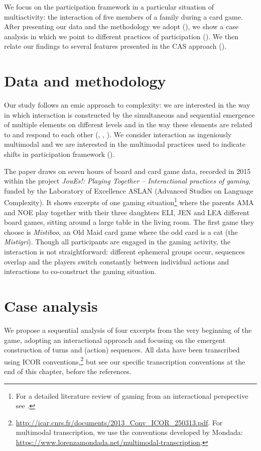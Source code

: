 \documentclass[output=paper]{langscibook}
\begin{document}
We focus on the participation framework in a particular situation of multiactivity: the interaction of five members of a family during a card game. After presenting our data and the methodology we adopt (), we show a case analysis in which we point to different practices of participation (). We then relate our findings to several features presented in the CAS approach (). 

\section{Data and methodology}\label{sec:13:2}

Our study follows an emic approach to complexity: we are interested in the way in which interaction is constructed by the simultaneous and sequential emergence of multiple elements on different levels and in the way these elements are related to and respond to each other (\citealt{Mondada2019}, \citealt{Keevalik2018}, \citealt{ImoLanwer2016}). We consider interaction as ingeniously multimodal and we are interested in the multimodal practices used to indicate shifts in participation framework (\citealt{CobelasCartagenaPriego-Vazquez2019}). 

The paper draws on seven hours of board and card game data, recorded in 2015 within the project \textit{JouEs!: Playing Together – Interactional practices of gaming}, funded by the Laboratory of Excellence ASLAN (Advanced Studies on Language Complexity). It shows excerpts of one gaming situation\footnote{For a detailed literature review of gaming from an interactional perspective see \citet{HofstetterRobles2018}.}  where the parents AMA and NOE play together with their three daughters ELI, JEN and LEA different board games, sitting around a large table in the living room. The first game they choose is \textit{Mistiboo}, an Old Maid card game where the odd card is a cat (the \textit{Mistigri}). Though all participants are engaged in the gaming activity, the interaction is not straightforward: different ephemeral groups occur, sequences overlap and the players switch constantly between individual actions and interactions to co-construct the gaming situation. 

\section{Case analysis}\label{sec:13:3}
We propose a sequential analysis of four excerpts from the very beginning of the game, adopting an interactional approach and focusing on the emergent construction of turns and (action) sequences. All data have been transcribed using ICOR conventions,\footnote{\url{http://icar.cnrs.fr/documents/2013_Conv_ICOR_250313.pdf}. For multimodal transcription, we use the conventions developed by Mondada: \url{https://www.lorenzamondada.net/multimodal-transcription},} but see our specific transcription conventions at the end of this chapter, before the references.
\end{document}
